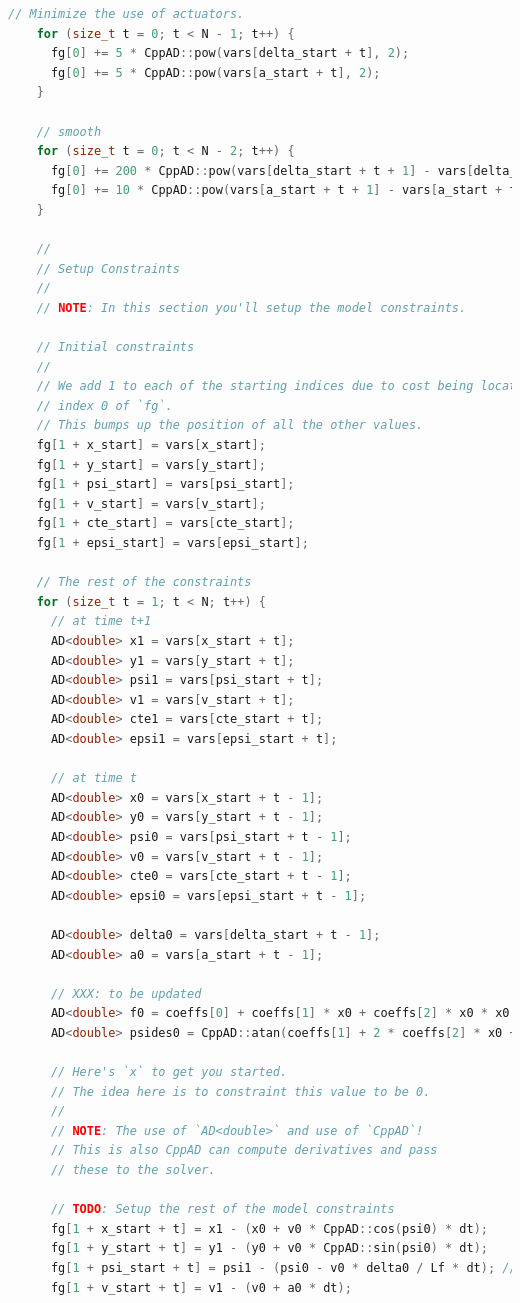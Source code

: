 \documentclass[11pt]{article}
\begin{document}
\begin{lstlisting}[language=C++, caption={MPC solver with ipopt}]
    // Minimize the use of actuators.
    for (size_t t = 0; t < N - 1; t++) {
      fg[0] += 5 * CppAD::pow(vars[delta_start + t], 2);
      fg[0] += 5 * CppAD::pow(vars[a_start + t], 2);
    }

    // smooth
    for (size_t t = 0; t < N - 2; t++) {
      fg[0] += 200 * CppAD::pow(vars[delta_start + t + 1] - vars[delta_start + t], 2);
      fg[0] += 10 * CppAD::pow(vars[a_start + t + 1] - vars[a_start + t], 2);
    }

    //
    // Setup Constraints
    //
    // NOTE: In this section you'll setup the model constraints.

    // Initial constraints
    //
    // We add 1 to each of the starting indices due to cost being located at
    // index 0 of `fg`.
    // This bumps up the position of all the other values.
    fg[1 + x_start] = vars[x_start];
    fg[1 + y_start] = vars[y_start];
    fg[1 + psi_start] = vars[psi_start];
    fg[1 + v_start] = vars[v_start];
    fg[1 + cte_start] = vars[cte_start];
    fg[1 + epsi_start] = vars[epsi_start];

    // The rest of the constraints
    for (size_t t = 1; t < N; t++) {
      // at time t+1
      AD<double> x1 = vars[x_start + t];
      AD<double> y1 = vars[y_start + t];
      AD<double> psi1 = vars[psi_start + t];
      AD<double> v1 = vars[v_start + t];
      AD<double> cte1 = vars[cte_start + t];
      AD<double> epsi1 = vars[epsi_start + t];

      // at time t
      AD<double> x0 = vars[x_start + t - 1];
      AD<double> y0 = vars[y_start + t - 1];
      AD<double> psi0 = vars[psi_start + t - 1];
      AD<double> v0 = vars[v_start + t - 1];
      AD<double> cte0 = vars[cte_start + t - 1];
      AD<double> epsi0 = vars[epsi_start + t - 1];

      AD<double> delta0 = vars[delta_start + t - 1];
      AD<double> a0 = vars[a_start + t - 1];

      // XXX: to be updated
      AD<double> f0 = coeffs[0] + coeffs[1] * x0 + coeffs[2] * x0 * x0 + coeffs[3] * x0 * x0 * x0;
      AD<double> psides0 = CppAD::atan(coeffs[1] + 2 * coeffs[2] * x0 + 3 * coeffs[3] * x0 * x0);

      // Here's `x` to get you started.
      // The idea here is to constraint this value to be 0.
      //
      // NOTE: The use of `AD<double>` and use of `CppAD`!
      // This is also CppAD can compute derivatives and pass
      // these to the solver.

      // TODO: Setup the rest of the model constraints
      fg[1 + x_start + t] = x1 - (x0 + v0 * CppAD::cos(psi0) * dt);
      fg[1 + y_start + t] = y1 - (y0 + v0 * CppAD::sin(psi0) * dt);
      fg[1 + psi_start + t] = psi1 - (psi0 - v0 * delta0 / Lf * dt); // XXX + -> - (as received from simulator)
      fg[1 + v_start + t] = v1 - (v0 + a0 * dt);


\end{lstlisting}
\end{document}
